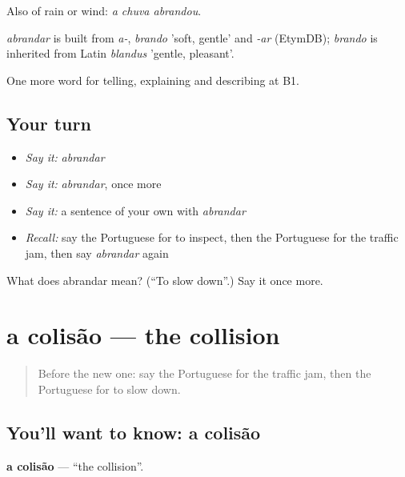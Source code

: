 Also of rain or wind: \emph{a chuva abrandou}.

\begin{cousinweb}
\emph{abrandar} is built from \emph{a-}, \emph{brando} 'soft, gentle' and \emph{-ar} (EtymDB); \emph{brando} is inherited from Latin \emph{blandus} 'gentle, pleasant'.
\end{cousinweb}

\begin{grammarlens}[title={What you've built}]
One more word for telling, explaining and describing at B1.
\end{grammarlens}

\subsection*{Your turn}
\begin{itemize}
\raggedright
  \item \emph{Say it:} \emph{abrandar}
  \item \emph{Say it:} \emph{abrandar}, once more
  \item \emph{Say it:} a sentence of your own with \emph{abrandar}
  \item \emph{Recall:} say the Portuguese for to inspect, then the Portuguese for the traffic jam, then say \emph{abrandar} again
\end{itemize}

\begin{tcolorbox}[breakable,colback=teal!4,colframe=teal!35!black,title={Before you move on}]
What does abrandar mean? (\textquotedblleft{}To slow down\textquotedblright{}.) Say it once more.
\end{tcolorbox}
\section[a colisão]{a colisão — the collision}

\label{lesson:PT-C409-colisao}



\begin{quote}
Before the new one: say the Portuguese for the traffic jam, then the Portuguese for to slow down.
\end{quote}

\subsection*{You'll want to know: a colisão}
\textbf{a colisão} — \textquotedblleft{}the collision\textquotedblright{}.

